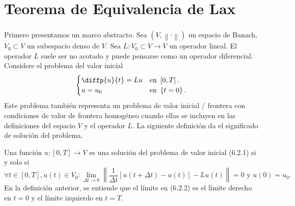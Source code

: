 \section{Teorema de Equivalencia de Lax}

\begin{frame}
	\frametitle{\insertsection}

	Primero presentamos un marco abstracto.
	Sea $\left(V,\left\|\cdot\right\|\right)$ un espacio de Banach,
	$V_{0}\subset V$ un subespacio denso de $V$.
	Sea $L\colon V_{0}\subset V\to V$ un operador lineal.
	El operador $L$ suele ser no acotado y puede pensarse como un
	operador diferencial.
	Considere el problema del valor inicial
	\begin{equation}\label{eq:heatPDE}
		\begin{cases}\displaystyle
			\diffp{u}{t}=
			Lu      &
			\text{en }\left[0,T\right]. \\
			u=u_{0} &
			\text{en }\left\{t=0\right\}.
		\end{cases}
	\end{equation}
	Este problema también representa un problema de valor inicial /
	frontera con condiciones de valor de frontera homogéneo cuando ellas
	se incluyen en las definiciones del espacio $V$ y el operador $L$.
	La siguiente definición da el significado de solución del problema.
	\begin{definition}
		Una función $u\colon\left[0,T\right]\to V$ es una solución del
		problema de valor inicial (6.2.1) si y solo si
		\begin{equation*}
			\forall t\in\left[0,T\right],
			u\left(t\right)\in V_{0}:
			\lim_{\Delta t\to 0}
			\left\|
			\frac{1}{\Delta t}
			\left[
				u\left(t+\Delta t\right)-
				u\left(t\right)
				\right]-
			Lu\left(t\right)
			\right\|=
			0\text{ y }
			u\left(0\right)=
			u_{0}.
		\end{equation*}
		En la definición anterior, se entiende que el límite en (6.2.2) es
		el límite derecho en $t=0$ y el límite izquierdo en $t=T$.
	\end{definition}
\end{frame}

